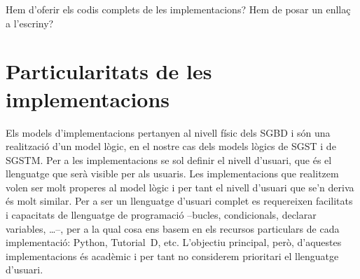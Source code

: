   Hem d'oferir els codis complets de les implementacions?
Hem de posar un enllaç a l'escriny?














\section{Particularitats de les implementacions}



Els models d'implementacions pertanyen al nivell físic dels \gls{SGBD}
i són una realització d'un model lògic, en el nostre cas dels models
lògics de \gls{SGST} i de \gls{SGSTM}. Per a les implementacions se
sol definir el nivell d'usuari, que és el llenguatge que serà visible
per als usuaris. Les implementacions que realitzem volen ser molt
properes al model lògic i per tant el nivell d'usuari que se'n deriva
és molt similar. Per a ser un llenguatge d'usuari complet es
requereixen facilitats i capacitats de llenguatge de programació
--bucles, condicionals, declarar variables, \dots--, per a la qual
cosa ens basem en els recursos particulars de cada implementació:
Python, Tutorial~D, etc. L'objectiu principal, però, d'aquestes
implementacions és acadèmic i per tant no considerem prioritari el
llenguatge d'usuari.




